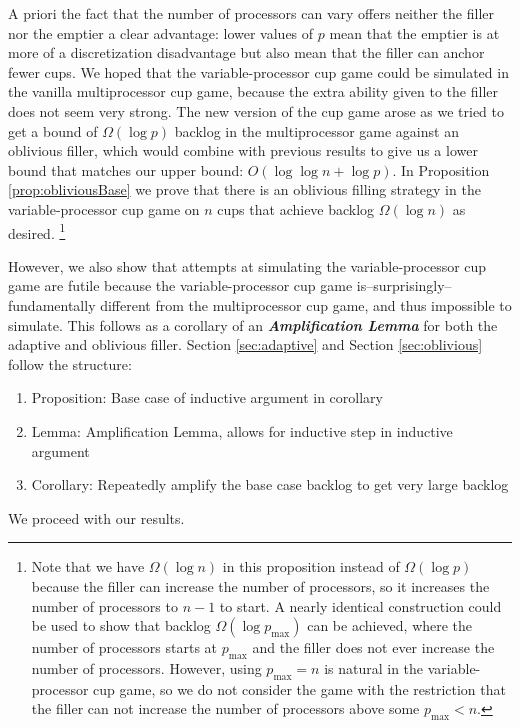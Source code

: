 \documentclass[twocolumn]{article}[11pt]
\newcommand{\defn}[1]{{\textit{\textbf{\boldmath #1}}}}
\begin{document}
A priori the fact that the number of processors can vary offers neither the
filler nor the emptier a clear advantage: lower values of $p$ mean that the
emptier is at more of a discretization disadvantage but also mean that the
filler can anchor fewer cups. We hoped that the variable-processor cup game
could be simulated in the vanilla multiprocessor cup game, because the extra
ability given to the filler does not seem very strong. The new version of the
cup game arose as we tried to get a bound of $\Omega(\log p)$ backlog in the
multiprocessor game against an oblivious filler, which would combine with
previous results to give us a lower bound that matches our upper bound:
$O(\log\log n + \log p)$. In Proposition \ref{prop:obliviousBase} we prove that
there is an oblivious filling strategy in the variable-processor cup game on
$n$ cups that achieve backlog $\Omega(\log n)$ as desired. \footnote{Note that
  we have $\Omega(\log n)$ in this proposition instead of $\Omega(\log p)$
  because the filler can increase the number of processors, so it increases the
  number of processors to $n-1$ to start. A nearly identical construction could
  be used to show that backlog $\Omega(\log p_{\max})$ can be achieved, where
  the number of processors starts at $p_{\max}$ and the filler does not ever
  increase the number of processors. However, using $p_{\max} = n$ is natural
  in the variable-processor cup game, so we do not consider the game with 
the restriction that the filler can not increase the number of processors above
some $p_{\max} < n$.}

However, we also show that attempts at simulating the variable-processor cup
game are futile because the variable-processor cup game
is--surprisingly--fundamentally different from the multiprocessor cup game, and
thus impossible to simulate. This follows as a corollary of an
\defn{Amplification Lemma} for both the adaptive and oblivious filler.
Section \ref{sec:adaptive} and Section \ref{sec:oblivious} follow the structure:
\begin{enumerate}
  \item Proposition: Base case of inductive argument in corollary
  \item Lemma: Amplification Lemma, allows for inductive step in inductive argument
  \item Corollary: Repeatedly amplify the base case backlog to get very large backlog
\end{enumerate}
We proceed with our results.
\end{document}
